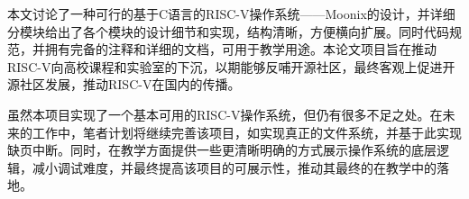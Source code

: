 \begin{conclusions}
	
本文讨论了一种可行的基于C语言的RISC-V操作系统——Moonix的设计，并详细分模块给出了各个模块的设计细节和实现，结构清晰，方便横向扩展。同时代码规范，并拥有完备的注释和详细的文档，可用于教学用途。本论文项目旨在推动RISC-V向高校课程和实验室的下沉，以期能够反哺开源社区，最终客观上促进开源社区发展，推动RISC-V在国内的传播。

虽然本项目实现了一个基本可用的RISC-V操作系统，但仍有很多不足之处。在未来的工作中，笔者计划将继续完善该项目，如实现真正的文件系统，并基于此实现缺页中断。同时，在教学方面提供一些更清晰明确的方式展示操作系统的底层逻辑，减小调试难度，并最终提高该项目的可展示性，推动其最终的在教学中的落地。

\end{conclusions}
